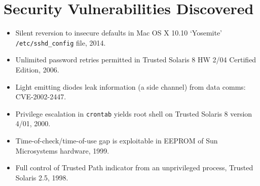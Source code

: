 \vspace{2mm}
\section*{Security Vulnerabilities Discovered}

\vspace{-2mm}
\begin{itemize}
    \item Silent reversion to insecure defaults in Mac OS X 10.10 `Yosemite'
        \texttt{/etc/sshd\_config} file, 2014.\vspace{-3mm}
	\item Unlimited password retries permitted in Trusted Solaris 8 HW 2/04
		Certified Edition, 2006.\vspace{-3mm}
	\item Light emitting diodes leak information (a side channel) from data
        comms: CVE-2002-2447.\vspace{-3mm}
	\item Privilege escalation in \verb,crontab, yields root shell on Trusted
		Solaris 8 version 4/01, 2000.\vspace{-3mm}
    \item Time-of-check/time-of-use gap is exploitable in EEPROM of
        Sun Microsystems hardware, 1999.\vspace{-3mm}
    \item Full control of Trusted Path indicator from an unprivileged process,
        Trusted Solaris 2.5, 1998.\vspace{-3mm}
\end{itemize}


